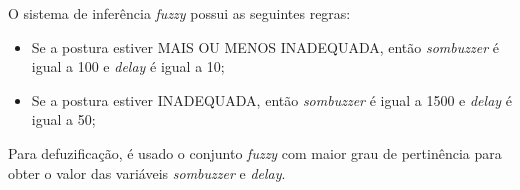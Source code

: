 \documentclass[12pt]{article}
\begin{document}
\break

O sistema de inferência \textit{fuzzy} possui as seguintes regras:

\begin{itemize}
    \item Se a postura estiver MAIS OU MENOS INADEQUADA, então \textit{sombuzzer} é igual a 100 e \textit{delay} é igual a 10;
    \item Se a postura estiver INADEQUADA, então \textit{sombuzzer} é igual a 1500 e \textit{delay} é igual a 50;
\end{itemize}

Para defuzificação, é usado o conjunto \textit{fuzzy} com maior grau de pertinência para obter o valor das variáveis \textit{sombuzzer} e \textit{delay}.



\end{document}
